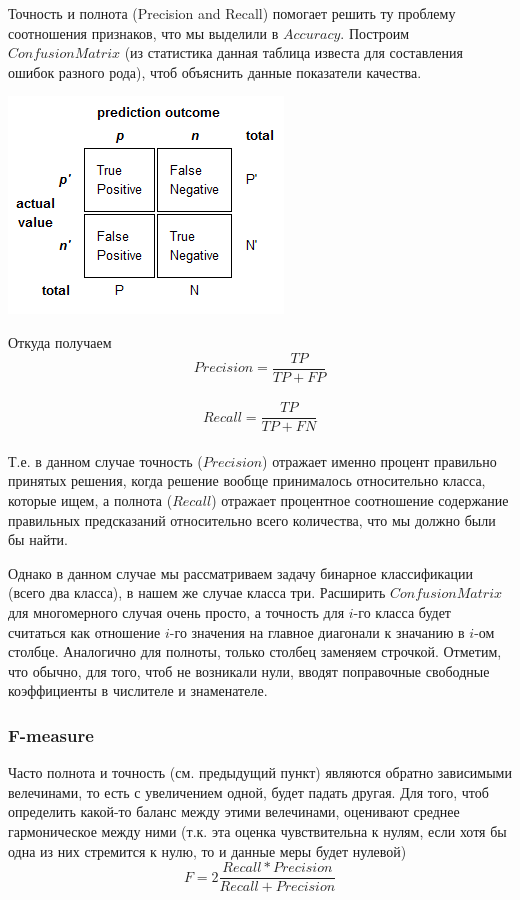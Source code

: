 \documentclass[11pt]{article}
\makeatletter
\def\maxwidth{\ifdim\Gin@nat@width>\linewidth\linewidth
    \else\Gin@nat@width\fi}
\let\Oldincludegraphics\includegraphics
\renewcommand{\includegraphics}[1]{\Oldincludegraphics[width=.8\maxwidth]{#1}}
\makeatother
\begin{document}
    Точность и полнота (Precision and Recall) помогает решить ту проблему
соотношения признаков, что мы выделили в \(Accuracy\). Построим
\(Confusion Matrix\) (из статистика данная таблица известа для
составления ошибок разного рода), чтоб объяснить данные показатели
качества. 
    \begin{center}
    \includegraphics{ysM0Z.png}
    \end{center} Откуда
получаем \[Precision = \dfrac{TP}{TP+FP}\]\\
\[Recall = \dfrac{TP}{TP+FN}\]\\
Т.е. в данном случае точность (\(Precision\)) отражает именно процент
правильно принятых решения, когда решение вообще принималось
относительно класса, которые ищем, а полнота (\(Recall\)) отражает
процентное соотношение содержание правильных предсказаний относительно
всего количества, что мы должно были бы найти.

    Однако в данном случае мы рассматриваем задачу бинарное классификации
(всего два класса), в нашем же случае класса три. Расширить
\(Confusion Matrix\) для многомерного случая очень просто, а точность
для \(i\)-го класса будет считаться как отношение \(i\)-го значения на
главное диагонали к значанию в \(i\)-ом столбце. Аналогично для полноты,
только столбец заменяем строчкой. Отметим, что обычно, для того, чтоб не
возникали нули, вводят поправочные свободные коэффициенты в числителе и
знаменателе.

    \subsubsection{F-measure}\label{f-measure}

    Часто полнота и точность (см. предыдущий пункт) являются обратно
зависимыми велечинами, то есть с увеличением одной, будет падать другая.
Для того, чтоб определить какой-то баланс между этими велечинами,
оценивают среднее гармоническое между ними (т.к. эта оценка
чувствительна к нулям, если хотя бы одна из них стремится к нулю, то и
данные меры будет нулевой)
\[F=2\dfrac{Recall * Precision}{Recall+Precision}\]
\end{document}
